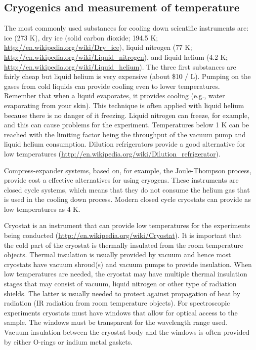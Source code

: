 \documentclass[byrevtex,amssymb,aps,pra,floatfix,letterpaper]{revtex4}
\begin{document}
\subsection{Cryogenics and measurement of temperature}

The most commonly used substances for cooling down scientific instruments are: ice (273 K), dry ice (solid carbon dioxide; 194.5 K; \url{http://en.wikipedia.org/wiki/Dry_ice}), liquid nitrogen (77 K; \url{http://en.wikipedia.org/wiki/Liquid_nitrogen}), and liquid helium (4.2 K; \url{http://en.wikipedia.org/wiki/Liquid_helium}). The three first substances are fairly cheap but liquid helium is very expensive (about \$10 / L). Pumping on the gases from cold liquids can provide cooling even to lower temperatures. Remember that when a liquid evaporates, it provides cooling (e.g., water evaporating from your skin). This technique is often applied with liquid helium because there is no danger of it freezing. Liquid nitrogen can freeze, for example, and this can cause problems for the experiment. Temperatures below 1 K can be reached with the limiting factor being the throughput of the vacuum pump and liquid helium consumption. Dilution refrigerators provide a good alternative for low temperatures (\url{http://en.wikipedia.org/wiki/Dilution_refrigerator}).

Compress-expander systems, based on, for example, the Joule-Thompson process, provide cost a effective alternatives for using cryogens. These instruments are closed cycle systems, which means that they do not consume the helium gas that is used in the cooling down process. Modern closed cycle cryostats can provide as low temperatures as 4 K. 

Cryostat is an instrument that can provide low temperatures for the experiments being conducted (\url{http://en.wikipedia.org/wiki/Cryostat}). It is important that the cold part of the cryostat is thermally insulated from the room temperature objects. Thermal insulation is usually provided by vacuum and hence most cryostats have vacuum shroud(s) and vacuum pumps to provide insulation. When low temperatures are needed, the cryostat may have multiple thermal insulation stages that may consist of vacuum, liquid nitrogen or other type of radiation shields. The latter is usually needed to protect against propagation of heat by radiation (IR radiation from room temperature objects). For spectroscopic experiments cryostats must have windows that allow for optical access to the sample. The windows must be transparent for the wavelength range used. Vacuum insulation between the cryostat body and the windows is often provided by either O-rings or indium metal gaskets.
\end{document}

